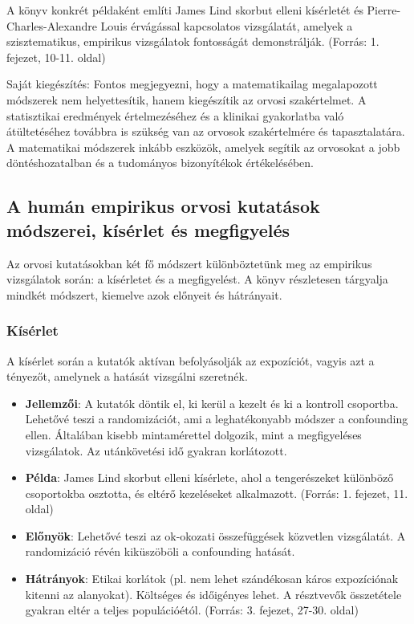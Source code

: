 \documentclass[a4paper,12pt]{article}
\begin{document}
A könyv konkrét példaként említi James Lind skorbut elleni kísérletét és Pierre-Charles-Alexandre Louis érvágással kapcsolatos vizsgálatát, amelyek a szisztematikus, empirikus vizsgálatok fontosságát demonstrálják. (Forrás: 1. fejezet, 10-11. oldal)

Saját kiegészítés: Fontos megjegyezni, hogy a matematikailag megalapozott módszerek nem helyettesítik, hanem kiegészítik az orvosi szakértelmet. A statisztikai eredmények értelmezéséhez és a klinikai gyakorlatba való átültetéséhez továbbra is szükség van az orvosok szakértelmére és tapasztalatára. A matematikai módszerek inkább eszközök, amelyek segítik az orvosokat a jobb döntéshozatalban és a tudományos bizonyítékok értékelésében.

\subsection{A humán empirikus orvosi kutatások módszerei, kísérlet és megfigyelés}

Az orvosi kutatásokban két fő módszert különböztetünk meg az empirikus vizsgálatok során: a kísérletet és a megfigyelést. A könyv részletesen tárgyalja mindkét módszert, kiemelve azok előnyeit és hátrányait.

\subsubsection{Kísérlet}

A kísérlet során a kutatók aktívan befolyásolják az expozíciót, vagyis azt a tényezőt, amelynek a hatását vizsgálni szeretnék.

\begin{itemize}

\item \textbf{Jellemzői}: A kutatók döntik el, ki kerül a kezelt és ki a kontroll csoportba. Lehetővé teszi a randomizációt, ami a leghatékonyabb módszer a confounding ellen. Általában kisebb mintamérettel dolgozik, mint a megfigyeléses vizsgálatok. Az utánkövetési idő gyakran korlátozott.

\item \textbf{Példa}: James Lind skorbut elleni kísérlete, ahol a tengerészeket különböző csoportokba osztotta, és eltérő kezeléseket alkalmazott. (Forrás: 1. fejezet, 11. oldal)

\item \textbf{Előnyök}: Lehetővé teszi az ok-okozati összefüggések közvetlen vizsgálatát.
A randomizáció révén kiküszöböli a confounding hatását.

\item \textbf{Hátrányok}: Etikai korlátok (pl. nem lehet szándékosan káros expozíciónak kitenni az alanyokat).
Költséges és időigényes lehet.
A résztvevők összetétele gyakran eltér a teljes populációétól. (Forrás: 3. fejezet, 27-30. oldal)

\end{itemize}
\end{document}
